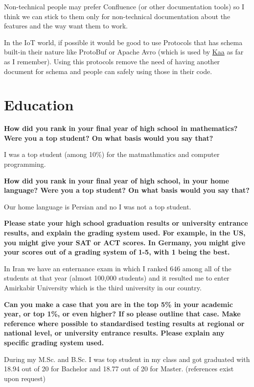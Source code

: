 Non-technical people may prefer Confluence (or other documentation tools) so I think we can stick to them only for
non-technical documentation about the features and the way want them to work.

In the IoT world, if possible it would be good to use Protocols that has schema built-in their nature like ProtoBuf or
Apache Avro (which is used by \href{https://github.com/kaaproject/kaa}{Kaa} as far as I remember). Using this protocols
remove the need of having another document for schema and people can safely using those in their code.

\section{Education}

\noindent
\textbf{How did you rank in your final year of high school in mathematics? Were you a top student? On what basis would you say that?}

I was a top student (among 10\%) for the matmathmatics and computer programming.

\noindent
\textbf{How did you rank in your final year of high school, in your home language? Were you a top student? On what basis would you say that?}

Our home language is Persian and no I was not a top student.

\noindent
\textbf{Please state your high school graduation results or university entrance results, and explain the grading system used. For example, in the US, you might give your SAT or ACT scores.
In Germany, you might give your scores out of a grading system of 1-5, with 1 being the best.}

In Iran we have an enternance exam in which I ranked 646 among all of the students at that year (almost 100,000 students)
and it resulted me to enter Amirkabir University which is the third university in our country.

\noindent
\textbf{Can you make a case that you are in the top 5\% in your academic year, or top 1\%, or even higher?
If so please outline that case. Make reference where possible to standardised testing results at regional or national level, or university entrance results. Please explain any specific grading system used.}

During my M.Sc. and B.Sc. I was top student in my class and got graduated with 18.94 out of 20 for Bachelor and 18.77 out of 20 for Master.
(references exist upon request)

